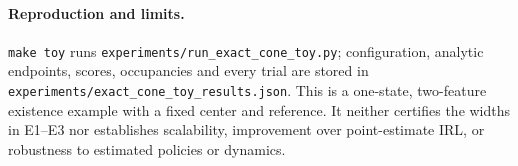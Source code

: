 \paragraph{Reproduction and limits.}
\texttt{make toy} runs \texttt{experiments/run\_exact\_cone\_toy.py}; configuration,
analytic endpoints, scores, occupancies and every trial are stored in
\texttt{experiments/exact\_cone\_toy\_results.json}. This is a one-state,
two-feature existence example with a fixed center and reference. It neither
certifies the widths in E1--E3 nor establishes scalability, improvement over
point-estimate IRL, or robustness to estimated policies or dynamics.
